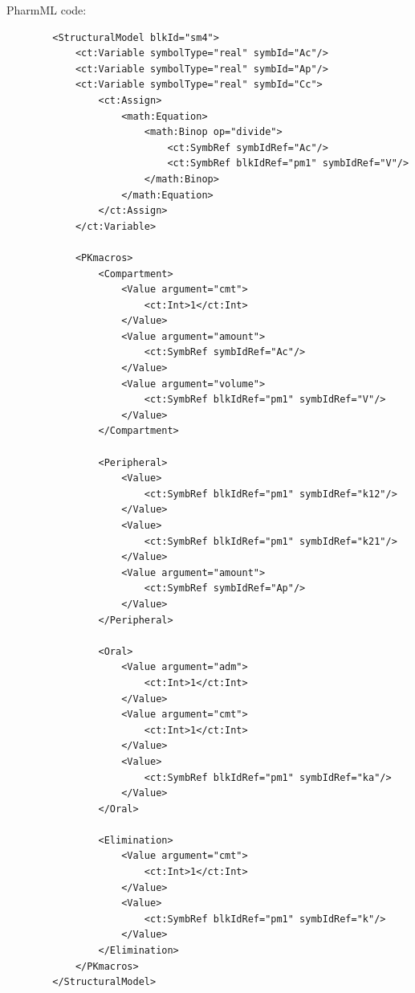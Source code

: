 PharmML code:
\lstset{language=XML}
\begin{lstlisting}
        <StructuralModel blkId="sm4">
            <ct:Variable symbolType="real" symbId="Ac"/>
            <ct:Variable symbolType="real" symbId="Ap"/>
            <ct:Variable symbolType="real" symbId="Cc">
                <ct:Assign>
                    <math:Equation>
                        <math:Binop op="divide">
                            <ct:SymbRef symbIdRef="Ac"/>
                            <ct:SymbRef blkIdRef="pm1" symbIdRef="V"/>
                        </math:Binop>
                    </math:Equation>
                </ct:Assign>
            </ct:Variable>
            
            <PKmacros>
                <Compartment>
                    <Value argument="cmt">
                        <ct:Int>1</ct:Int>
                    </Value>
                    <Value argument="amount">
                        <ct:SymbRef symbIdRef="Ac"/>
                    </Value>
                    <Value argument="volume">
                        <ct:SymbRef blkIdRef="pm1" symbIdRef="V"/>
                    </Value>
                </Compartment>
                
                <Peripheral>
                    <Value>
                        <ct:SymbRef blkIdRef="pm1" symbIdRef="k12"/>
                    </Value>
                    <Value>
                        <ct:SymbRef blkIdRef="pm1" symbIdRef="k21"/>
                    </Value>
                    <Value argument="amount">
                        <ct:SymbRef symbIdRef="Ap"/>
                    </Value>
                </Peripheral>
                
                <Oral>
                    <Value argument="adm">
                        <ct:Int>1</ct:Int>
                    </Value>
                    <Value argument="cmt">
                        <ct:Int>1</ct:Int>
                    </Value>
                    <Value>
                        <ct:SymbRef blkIdRef="pm1" symbIdRef="ka"/>
                    </Value>
                </Oral>
                
                <Elimination>
                    <Value argument="cmt">
                        <ct:Int>1</ct:Int>
                    </Value>
                    <Value>
                        <ct:SymbRef blkIdRef="pm1" symbIdRef="k"/>
                    </Value>
                </Elimination>
            </PKmacros>
        </StructuralModel>
\end{lstlisting}


